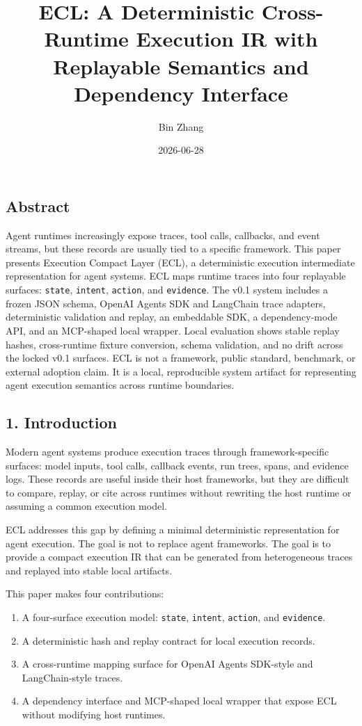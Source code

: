 \documentclass[
]{article}
\title{ECL: A Deterministic Cross-Runtime Execution IR with Replayable
Semantics and Dependency Interface}
\author{Bin Zhang}
\date{2026-06-28}
\providecommand{\tightlist}{%
  \setlength{\itemsep}{0pt}\setlength{\parskip}{0pt}}
\begin{document}
\maketitle

\subsection{Abstract}\label{abstract}

Agent runtimes increasingly expose traces, tool calls, callbacks, and
event streams, but these records are usually tied to a specific
framework. This paper presents Execution Compact Layer (ECL), a
deterministic execution intermediate representation for agent systems.
ECL maps runtime traces into four replayable surfaces: \texttt{state},
\texttt{intent}, \texttt{action}, and \texttt{evidence}. The v0.1 system
includes a frozen JSON schema, OpenAI Agents SDK and LangChain trace
adapters, deterministic validation and replay, an embeddable SDK, a
dependency-mode API, and an MCP-shaped local wrapper. Local evaluation
shows stable replay hashes, cross-runtime fixture conversion, schema
validation, and no drift across the locked v0.1 surfaces. ECL is not a
framework, public standard, benchmark, or external adoption claim. It is
a local, reproducible system artifact for representing agent execution
semantics across runtime boundaries.

\subsection{1. Introduction}\label{introduction}

Modern agent systems produce execution traces through framework-specific
surfaces: model inputs, tool calls, callback events, run trees, spans,
and evidence logs. These records are useful inside their host
frameworks, but they are difficult to compare, replay, or cite across
runtimes without rewriting the host runtime or assuming a common
execution model.

ECL addresses this gap by defining a minimal deterministic
representation for agent execution. The goal is not to replace agent
frameworks. The goal is to provide a compact execution IR that can be
generated from heterogeneous traces and replayed into stable local
artifacts.

This paper makes four contributions:

\begin{enumerate}
\def\labelenumi{\arabic{enumi}.}
\tightlist
\item
  A four-surface execution model: \texttt{state}, \texttt{intent},
  \texttt{action}, and \texttt{evidence}.
\item
  A deterministic hash and replay contract for local execution records.
\item
  A cross-runtime mapping surface for OpenAI Agents SDK-style and
  LangChain-style traces.
\item
  A dependency interface and MCP-shaped local wrapper that expose ECL
  without modifying host runtimes.
\end{enumerate}
\end{document}
